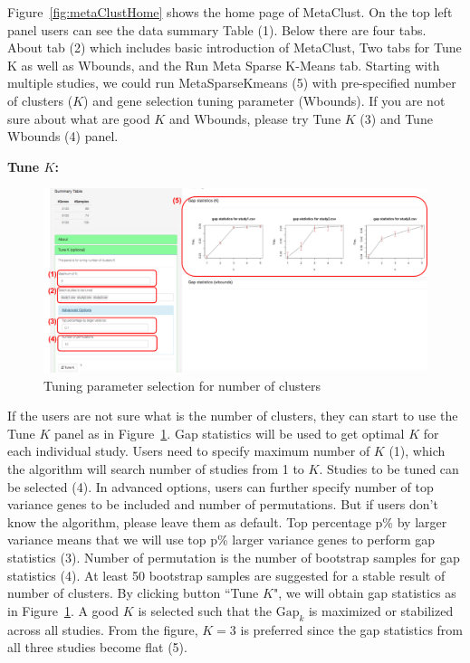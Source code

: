 Figure~\ref{fig:metaClustHome} shows the home page of MetaClust.
On the top left panel users can see the data summary Table {\color{red} (1)}.
Below there are four tabs. 
About tab {\color{red} (2)} which includes basic introduction of MetaClust, Two tabs for Tune K as well as Wbounds, and the Run Meta Sparse K-Means tab.
Starting with multiple studies, 
we could run MetaSparseKmeans {\color{red} (5)} with pre-specified number of clusters ($K$) and gene selection tuning parameter (Wbounds).
If you are not sure about what are good $K$ and Wbounds, please try Tune $K$ {\color{red} (3)} and Tune Wbounds {\color{red} (4)} panel.

\begin{steps}

\item \textbf{Tune $K$:} 

\begin{figure}[H]
\begin{center}
\includegraphics[scale=0.5]{./figure/metaClust/tuneK.pdf}
\caption{Tuning parameter selection for number of clusters}
\label{fig:metaClusttuneK}
\end{center}
\end{figure}

If the users are not sure what is the number of clusters,
they can start to use the Tune $K$ panel as in Figure~\ref{fig:metaClusttuneK}.
Gap statistics will be used to get optimal $K$ for each individual study.
Users need to specify maximum number of $K$ {\color{red} (1)}, which the algorithm will search number of studies from 1 to $K$.
Studies to be tuned can be selected {\color{red} (4)}.
In advanced options, users can further specify number of top variance genes to be included and number of permutations.
But if users don't know the algorithm, please leave them as default.
Top percentage p\% by larger variance means that we will use top p\% larger variance genes to perform gap statistics {\color{red} (3)}.
Number of permutation is the number of bootstrap samples for gap statistics {\color{red} (4)}.
At least 50 bootstrap samples are suggested for a stable result of number of clusters.
By clicking button ``Tune $K$",
we will obtain gap statistics as in Figure~\ref{fig:metaClusttuneK}.
A good $K$ is selected such that the $\mbox{Gap}_k$ is maximized or stabilized across all studies.
From the figure, $K=3$ is preferred since the gap statistics from all three studies become flat {\color{red} (5)}.


\end{steps}

